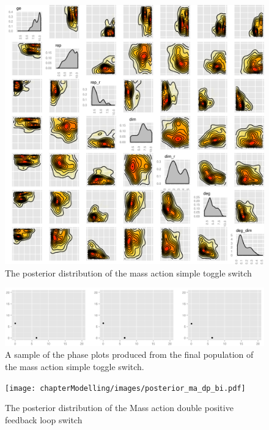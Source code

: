 \begin{figure}[p]
\centering
\includegraphics[scale=0.7]{chapterModelling/images/posterior_ma_cl_bi.pdf}
\caption{The posterior distribution of the mass action simple toggle switch}
\label{fig:det_std}
\end{figure}

\begin{figure}[p]
\centering
\includegraphics[scale=0.3]{chapterModelling/images/ma_cl_bi_phase_plot.png}
\caption{A sample of the phase plots produced from the final population of the mass action simple toggle switch.}
\label{fig:det_std_phase}
\end{figure}

\begin{figure}[p]
\centering
\texttt{[image: chapterModelling/images/posterior\_ma\_dp\_bi.pdf]}
\caption{The posterior distribution of the Mass action double positive feedback loop switch}
\label{fig:doub_pos}
\end{figure}

